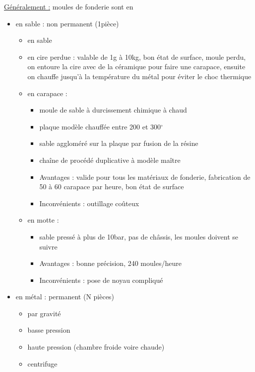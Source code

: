 \documentclass[../main.tex]{subfiles}
\begin{document}
\underline{Généralement :} moules de fonderie sont en \begin{itemize}
    \item en sable : non permanent (1pièce) \begin{itemize}
        \item en sable\\
        \item en cire perdue : valable de 1g à 10kg, bon état de surface, moule perdu, on entoure la cire avec de la céramique pour faire une carapace, ensuite on chauffe jusqu'à la température du métal pour éviter le choc thermique\\
        \item en carapace : \begin{itemize}
            \item moule de sable à durcissement chimique à chaud\\
            \item plaque modèle chauffée entre 200 et 300$^\circ$\\
            \item sable aggloméré sur la plaque par fusion de la résine\\
            \item chaîne de procédé duplicative à modèle maître\\
            \item Avantages : valide pour tous les matériaux de fonderie, fabrication de 50 à 60 carapace par heure, bon état de surface\\
            \item Inconvénients : outillage coûteux\\
        \end{itemize}
        \item en motte  :\begin{itemize}
            \item sable pressé à plus de 10bar, pas de châssis, les moules doivent se suivre\\
            \item Avantages : bonne précision, 240 moules/heure\\
            \item Inconvénients : pose de noyau compliqué\\
        \end{itemize}
    \end{itemize}
    
    \item en métal : permanent (N pièces) \begin{itemize}
        \item par gravité \\
        \item basse pression\\
        \item haute pression (chambre froide voire chaude)\\
        \item centrifuge\\
    \end{itemize}
\end{itemize}
\end{document}
